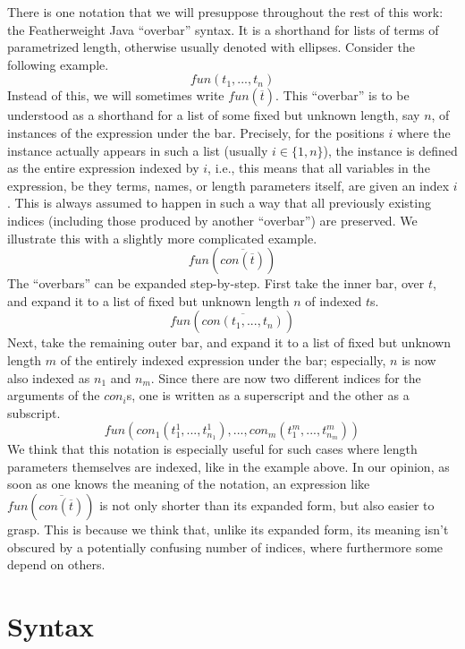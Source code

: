 There is one notation that we will presuppose throughout the rest of this work: the Featherweight Java\cite{igarashi01featherweight} ``overbar'' syntax. It is a shorthand for lists of terms of parametrized length, otherwise usually denoted with ellipses. Consider the following example.
\[
fun(t_1, ..., t_n)
\]
Instead of this, we will sometimes write $fun(\overline{t})$. This ``overbar'' is to be understood as a shorthand for a list of some fixed but unknown length, say $n$, of instances of the expression under the bar. Precisely, for the positions $i$ where the instance actually appears in such a list (usually $i \in \{1, n\}$), the instance is defined as the entire expression indexed by $i$, i.e., this means that all variables in the expression, be they terms, names, or length parameters itself, are given an index $i$. This is always assumed to happen in such a way that all previously existing indices (including those produced by another ``overbar'') are preserved. We illustrate this with a slightly more complicated example.
\[
fun(\overline{con(\overline{t})})
\]
The ``overbars'' can be expanded step-by-step. First take the inner bar, over $t$, and expand it to a list of fixed but unknown length $n$ of indexed $t$s.
\[
fun(\overline{con(t_1, ..., t_n)})
\]
Next, take the remaining outer bar, and expand it to a list of fixed but unknown length $m$ of the entirely indexed expression under the bar; especially, $n$ is now also indexed as $n_1$ and $n_m$. Since there are now two different indices for the arguments of the $con_i$s, one is written as a superscript and the other as a subscript.
\[
fun(con_1(t^1_1, ..., t^1_{n_1}), ..., con_m(t^m_1, ..., t^m_{n_m}))
\]
We think that this notation is especially useful for such cases where length parameters themselves are indexed, like in the example above. In our opinion, as soon as one knows the meaning of the notation, an expression like $fun(\overline{con(\overline{t})})$ is not only shorter than its expanded form, but also easier to grasp. This is because we think that, unlike its expanded form, its meaning isn't obscured by a potentially confusing number of indices, where furthermore some depend on others.

\section{Syntax}
\label{sec:urosyn}


